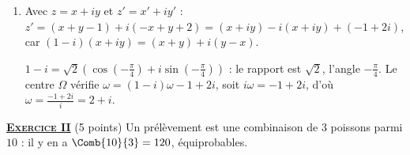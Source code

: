 \begin{enumerate}
\begin{enumerate}
				 (avec $OB = 2\,OC$, il n'est pas isocèle).
		\end{enumerate}
		\item {}
			Avec $z = x + iy$ et $z' = x' + iy'$ :
			$z' = (x + y - 1) + i(-x + y + 2) = (x + iy) - i(x + iy) + (-1 + 2i)$, car
			$(1-i)(x+iy) = (x+y) + i(y-x)$.


			$1 - i = \sqrt{2}\left(\cos\left(-\frac{\pi}{4}\right) + i\sin\left(-\frac{\pi}{4}\right)\right)$ :
			le rapport est $\sqrt{2}$, l'angle $-\frac{\pi}{4}$.
			Le centre $\Omega$ vérifie $\omega = (1-i)\omega - 1 + 2i$, soit $i\omega = -1 + 2i$, d'où
			$\omega = \frac{-1+2i}{i} = 2 + i$.

	\end{enumerate}
\noindent \underline{\textsc{\textbf{Exercice II}}} (5 points) \newline
	Un prélèvement est une combinaison de $3$ poissons parmi $10$ : il y en a $\Comb{10}{3} = 120$, équiprobables.
